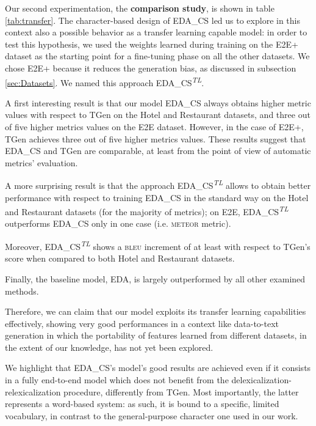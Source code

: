 \documentclass[runningheads, envcountsame, a4paper]{llncs}
\begin{document}
Our second experimentation, the \textbf{comparison study}, is shown in table \ref{tab:transfer}. The character-based design of EDA\_CS led us to explore in this context also a possible behavior as a transfer learning capable model: in order to test this hypothesis, we used the weights learned during training on the E2E+ dataset as the starting point for a fine-tuning phase on all the other datasets. We chose E2E+ because it reduces the generation bias, as discussed in subsection \ref{sec:Datasets}. We named this approach EDA\_CS\textsuperscript{\it TL}.

A first interesting result is that our model EDA\_CS always obtains higher metric values with respect to TGen on the Hotel and Restaurant datasets, and three out of five higher metrics values on the E2E dataset. However, in the case of E2E+, TGen achieves three out of five higher metrics values. These results suggest that EDA\_CS and TGen are comparable, at least from the point of view of automatic metrics' evaluation.

A more surprising result is that the approach EDA\_CS\textsuperscript{\it TL} allows to obtain better performance with respect to training EDA\_CS in the standard way on the Hotel and Restaurant datasets (for the majority of metrics); on E2E, EDA\_CS\textsuperscript{\it TL} outperforms EDA\_CS only in one case (i.e. \textsc{meteor} metric).

Moreover, EDA\_CS\textsuperscript{\it TL} shows a \textsc{bleu} increment of at least  with respect to TGen's score when compared to both Hotel and Restaurant datasets.

Finally, the baseline model, EDA, is largely outperformed by all other examined methods.

Therefore, we can claim that our model exploits its transfer learning capabilities effectively, showing very good performances in a context like data-to-text generation in which the portability of features learned from different datasets, in the extent of our knowledge, has not yet been explored.





We highlight that EDA\_CS's model's good results are achieved even if it consists in a fully end-to-end model which does not benefit from the delexicalization-relexicalization procedure, differently from TGen. Most importantly, the latter represents a word-based system: as such, it is bound to a specific, limited vocabulary, in contrast to the general-purpose character one used in our work.
\end{document}
